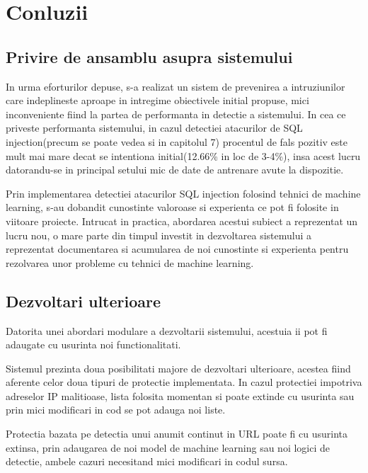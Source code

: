
 \chapter{Conluzii}
\label{cap:concluzii}
\section{Privire de ansamblu asupra sistemului}

In urma eforturilor depuse, s-a realizat un sistem de prevenirea a intruziunilor care indeplineste aproape in intregime obiectivele initial propuse, mici inconveniente fiind la partea de performanta in detectie a sistemului. In cea ce priveste performanta sistemului, in cazul detectiei atacurilor de SQL injection(precum se poate vedea si in capitolul 7) procentul de fals pozitiv este mult mai mare decat se intentiona initial(12.66\% in loc de 3-4\%), insa acest lucru datorandu-se in principal setului mic de date de antrenare avute la dispozitie.

Prin implementarea detectiei atacurilor SQL injection folosind tehnici de machine learning, s-au dobandit cunostinte valoroase si experienta ce pot fi folosite in viitoare proiecte. Intrucat in practica, abordarea acestui subiect a reprezentat un lucru nou, o mare parte din timpul investit in dezvoltarea sistemului a reprezentat documentarea si acumularea de noi cunostinte si experienta pentru rezolvarea unor probleme cu tehnici de machine learning.

\section{Dezvoltari ulterioare}

Datorita unei abordari modulare a dezvoltarii sistemului, acestuia ii pot fi adaugate cu usurinta noi functionalitati.
 
Sistemul prezinta doua posibilitati majore de dezvoltari ulterioare, acestea fiind aferente celor doua tipuri de protectie implementata. In cazul protectiei impotriva adreselor IP malitioase, lista folosita momentan si poate extinde cu usurinta sau prin mici modificari in cod se pot adauga noi liste.

Protectia bazata pe detectia unui anumit continut in URL poate fi cu usurinta extinsa, prin adaugarea de noi model de machine learning sau noi logici de detectie, ambele cazuri necesitand mici modificari in codul sursa.

